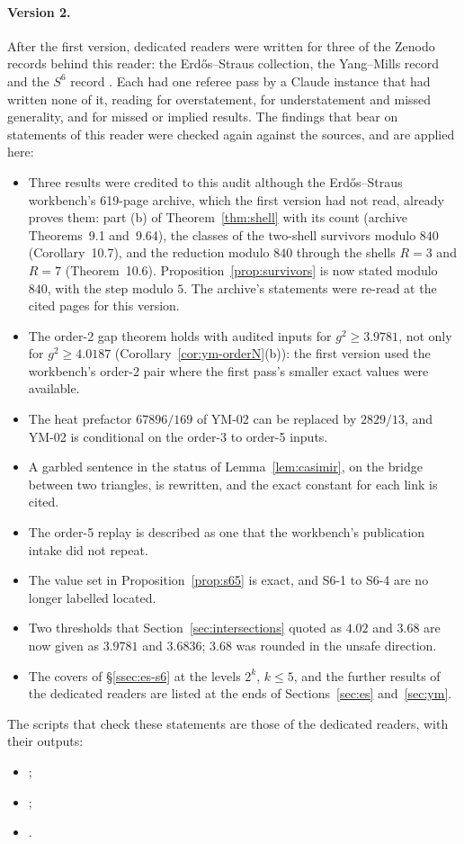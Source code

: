 \paragraph{Version 2.} After the first version, dedicated readers were written for three of the Zenodo records behind this reader: the Erdős--Straus collection, the Yang--Mills record and the $S^6$ record \cite{ESReader,YMReader,S6Reader}. Each had one referee pass by a Claude instance that had written none of it, reading for overstatement, for understatement and missed generality, and for missed or implied results. The findings that bear on statements of this reader were checked again against the sources, and are applied here:
\begin{itemize}
\item Three results were credited to this audit although the Erdős--Straus workbench's 619-page archive, which the first version had not read, already proves them: part (b) of Theorem~\ref{thm:shell} with its count (archive Theorems~9.1 and~9.64), the classes of the two-shell survivors modulo $840$ (Corollary~10.7), and the reduction modulo $840$ through the shells $R=3$ and $R=7$ (Theorem~10.6). Proposition~\ref{prop:survivors} is now stated modulo $840$, with the step modulo $5$. The archive's statements were re-read at the cited pages for this version.
\item The order-2 gap theorem holds with audited inputs for $g^2\ge3.9781$, not only for $g^2\ge4.0187$ (Corollary~\ref{cor:ym-orderN}(b)): the first version used the workbench's order-2 pair where the first pass's smaller exact values were available.
\item The heat prefactor $67896/169$ of YM-02 can be replaced by $2829/13$, and YM-02 is conditional on the order-3 to order-5 inputs.
\item A garbled sentence in the status of Lemma~\ref{lem:casimir}, on the bridge between two triangles, is rewritten, and the exact constant for each link is cited.
\item The order-5 replay is described as one that the workbench's publication intake did not repeat.
\item The value set in Proposition~\ref{prop:s65} is exact, and S6-1 to S6-4 are no longer labelled located.
\item Two thresholds that Section~\ref{sec:intersections} quoted as $4.02$ and $3.68$ are now given as $3.9781$ and $3.6836$; $3.68$ was rounded in the unsafe direction.
\item The covers of §\ref{ssec:es-s6} at the levels $2^k$, $k\le5$, and the further results of the dedicated readers are listed at the ends of Sections~\ref{sec:es} and~\ref{sec:ym}.
\end{itemize}
The scripts that check these statements are those of the dedicated readers, with their outputs:
\begin{itemize}
\item {};
\item {};
\item {}.
\end{itemize}

